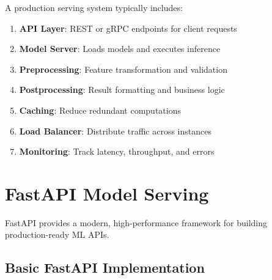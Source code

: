 A production serving system typically includes:

\begin{enumerate}
    \item \textbf{API Layer}: REST or gRPC endpoints for client requests
    \item \textbf{Model Server}: Loads models and executes inference
    \item \textbf{Preprocessing}: Feature transformation and validation
    \item \textbf{Postprocessing}: Result formatting and business logic
    \item \textbf{Caching}: Reduce redundant computations
    \item \textbf{Load Balancer}: Distribute traffic across instances
    \item \textbf{Monitoring}: Track latency, throughput, and errors
\end{enumerate}

\section{FastAPI Model Serving}

FastAPI provides a modern, high-performance framework for building production-ready ML APIs.

\subsection{Basic FastAPI Implementation}

